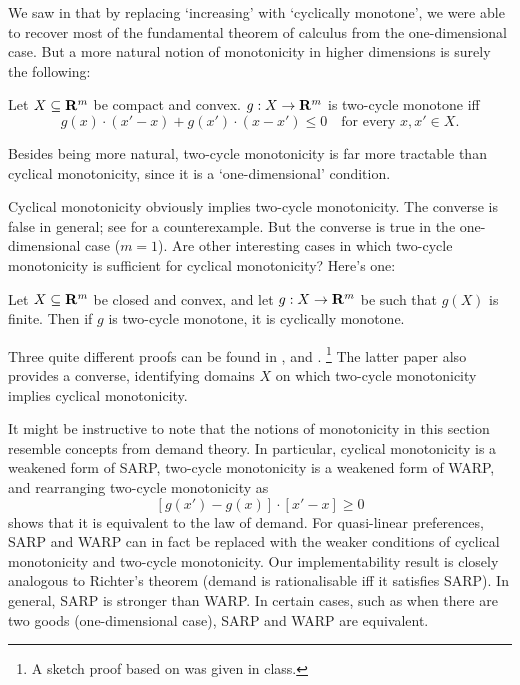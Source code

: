 \documentclass[11pt,letterpaper,reqno,oneside]{article}
\begin{document}
We saw in  that by replacing `increasing' with `cyclically monotone', we were able to recover most of the fundamental theorem of calculus from the one-dimensional case. But a more natural notion of monotonicity in higher dimensions is surely the following:
%
\begin{definition}
	Let $X \subseteq \mathbf{R}^m$ be compact and convex. $g : X \to \mathbf{R}^m$ is two-cycle monotone iff
	\begin{equation*}
		g(x) \cdot (x'-x) + g(x') \cdot (x-x') \leq 0
		\quad\text{for every $x,x' \in X$} .
	\end{equation*}
\end{definition}
%
\noindent Besides being more natural, two-cycle monotonicity is far more tractable than cyclical monotonicity, since it is a `one-dimensional' condition.

Cyclical monotonicity obviously implies two-cycle monotonicity. The converse is false in general; see \textcite[][p. 240]{Rockafellar1970} for a counterexample. But the converse is true in the one-dimensional case ($m=1$). Are other interesting cases in which two-cycle monotonicity is sufficient for cyclical monotonicity? Here's one:
%
\begin{theorem}
	\label{theorem:SaksYu}
	Let $X \subseteq \mathbf{R}^m$ be closed and convex, and let $g : X \to \mathbf{R}^m$ be such that $g(X)$ is finite. Then if $g$ is two-cycle monotone, it is cyclically monotone.
\end{theorem}

Three quite different proofs can be found in \textcite{SaksYu2005}, \textcite[][pp. 46--8]{Vohra2011} and \textcite{AshlagiEtAl2010}.%
	\footnote{A sketch proof based on \textcite{AshlagiEtAl2010} was given in class.}
The latter paper also provides a converse, identifying domains $X$ on which two-cycle monotonicity implies cyclical monotonicity.


It might be instructive to note that the notions of monotonicity in this section resemble concepts from demand theory. In particular, cyclical monotonicity is a weakened form of SARP, two-cycle monotonicity is a weakened form of WARP, and rearranging two-cycle monotonicity as
%
\begin{equation*}
	\left[ g(x') - g(x) \right] \cdot \left[ x' - x \right] \geq 0
\end{equation*}
%
shows that it is equivalent to the law of demand. For quasi-linear preferences, SARP and WARP can in fact be replaced with the weaker conditions of cyclical monotonicity and two-cycle monotonicity. Our implementability result is closely analogous to Richter's theorem (demand is rationalisable iff it satisfies SARP). In general, SARP is stronger than WARP. In certain cases, such as when there are two goods (one-dimensional case), SARP and WARP are equivalent.
\end{document}
